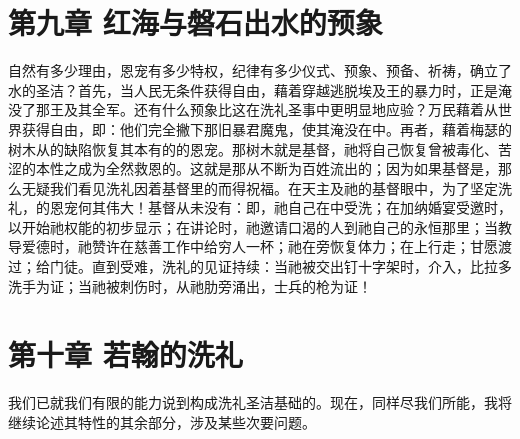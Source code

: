 
\section{第九章  红海与磐石出水的预象}

自然有多少理由，恩宠有多少特权，纪律有多少仪式、预象、预备、祈祷，确立了水的圣洁？首先，当人民无条件获得自由，藉着穿越逃脱埃及王的暴力时，正是淹没了那王及其全军。还有什么预象比这在洗礼圣事中更明显地应验？万民藉着从世界获得自由，即：他们完全撇下那旧暴君魔鬼，使其淹没在中。再者，藉着梅瑟的树木从的缺陷恢复其本有的的恩宠。那树木就是基督，祂将自己恢复曾被毒化、苦涩的本性之成为全然救恩的。这就是那从不断为百姓流出的；因为如果基督是，那么无疑我们看见洗礼因着基督里的而得祝福。在天主及祂的基督眼中，为了坚定洗礼，的恩宠何其伟大！基督从未没有：即，祂自己在中受洗；在加纳婚宴受邀时，以开始祂权能的初步显示；在讲论时，祂邀请口渴的人到祂自己的永恒那里；当教导爱德时，祂赞许在慈善工作中给穷人一杯；祂在旁恢复体力；在上行走；甘愿渡过；给门徒。直到受难，洗礼的见证持续：当祂被交出钉十字架时，介入，比拉多洗手为证；当祂被刺伤时，从祂肋旁涌出，士兵的枪为证！\par


\section{第十章  若翰的洗礼}

我们已就我们有限的能力说到构成洗礼圣洁基础的。现在，同样尽我们所能，我将继续论述其特性的其余部分，涉及某些次要问题。\par

